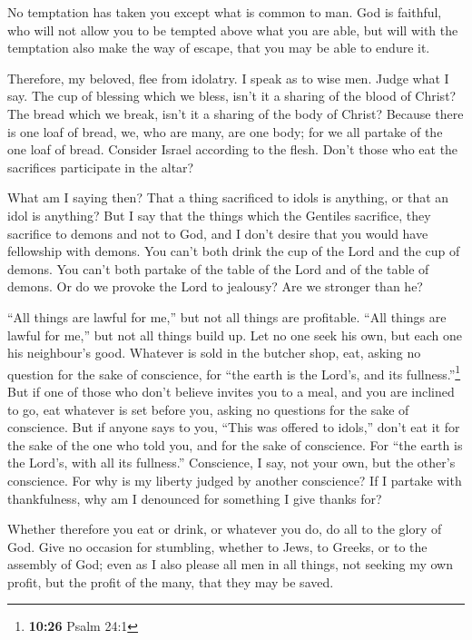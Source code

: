  No temptation has taken you except what is common to
man. God is faithful, who will not allow you to be tempted above what
you are able, but will with the temptation also make the way of escape,
that you may be able to endure it.

 Therefore, my beloved, flee from idolatry.
 I speak as to wise men. Judge what I say.
 The cup of blessing which we bless, isn't it a sharing
of the blood of Christ? The bread which we break, isn't it a sharing of
the body of Christ?  Because there is one loaf of bread,
we, who are many, are one body; for we all partake of the one loaf of
bread.  Consider Israel according to the flesh. Don't
those who eat the sacrifices participate in the altar?

 What am I saying then? That a thing sacrificed to idols
is anything, or that an idol is anything?  But I say that
the things which the Gentiles sacrifice, they sacrifice to demons and
not to God, and I don't desire that you would have fellowship with
demons.  You can't both drink the cup of the Lord and the
cup of demons. You can't both partake of the table of the Lord and of
the table of demons.  Or do we provoke the Lord to
jealousy? Are we stronger than he?

 ``All things are lawful for me,'' but not all things are
profitable. ``All things are lawful for me,'' but not all things build
up.  Let no one seek his own, but each one his
neighbour's good.  Whatever is sold in the butcher shop,
eat, asking no question for the sake of conscience,  for
``the earth is the Lord's, and its fullness.''\footnote{\textbf{10:26}
  Psalm 24:1}  But if one of those who don't believe
invites you to a meal, and you are inclined to go, eat whatever is set
before you, asking no questions for the sake of conscience.
 But if anyone says to you, ``This was offered to
idols,'' don't eat it for the sake of the one who told you, and for the
sake of conscience. For ``the earth is the Lord's, with all its
fullness.''  Conscience, I say, not your own, but the
other's conscience. For why is my liberty judged by another conscience?
 If I partake with thankfulness, why am I denounced for
something I give thanks for?

 Whether therefore you eat or drink, or whatever you do,
do all to the glory of God.  Give no occasion for
stumbling, whether to Jews, to Greeks, or to the assembly of God;
 even as I also please all men in all things, not seeking
my own profit, but the profit of the many, that they may be saved.

